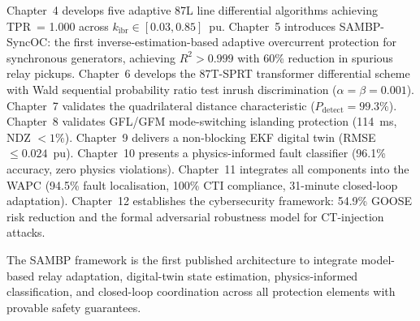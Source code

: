 \begin{doublespacing}
Chapter~4 develops five adaptive 87L line differential algorithms achieving
TPR~= 1.000 across $k_\mathrm{ibr} \in [0.03, 0.85]$~pu.
Chapter~5 introduces SAMBP-SyncOC: the first inverse-estimation-based adaptive
overcurrent protection for synchronous generators, achieving $R^2 > 0.999$
with 60\% reduction in spurious relay pickups.
Chapter~6 develops the 87T-SPRT transformer differential scheme with Wald
sequential probability ratio test inrush discrimination ($\alpha = \beta = 0.001$).
Chapter~7 validates the quadrilateral distance characteristic ($P_\mathrm{detect} = 99.3\%$).
Chapter~8 validates GFL/GFM mode-switching islanding protection (114~ms, NDZ $< 1\%$).
Chapter~9 delivers a non-blocking EKF digital twin (RMSE $\leq 0.024$~pu).
Chapter~10 presents a physics-informed fault classifier (96.1\% accuracy,
zero physics violations).
Chapter~11 integrates all components into the WAPC (94.5\% fault localisation,
100\% CTI compliance, 31-minute closed-loop adaptation).
Chapter~12 establishes the cybersecurity framework: 54.9\% GOOSE risk reduction
and the formal adversarial robustness model for CT-injection attacks.

The SAMBP framework is the first published architecture to integrate
model-based relay adaptation, digital-twin state estimation, physics-informed
classification, and closed-loop coordination across all protection elements
with provable safety guarantees.

\end{doublespacing}
